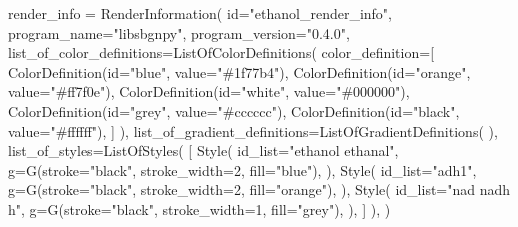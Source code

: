\documentclass[
  letterpaper,
  DIV=11,
  numbers=noendperiod]{scrartcl}
\newenvironment{Shaded}{\begin{snugshade}}{\end{snugshade}}
\newcommand{\BuiltInTok}[1]{\textcolor[rgb]{0.00,0.23,0.31}{#1}}
\newcommand{\DecValTok}[1]{\textcolor[rgb]{0.68,0.00,0.00}{#1}}
\newcommand{\NormalTok}[1]{\textcolor[rgb]{0.00,0.23,0.31}{#1}}
\newcommand{\OperatorTok}[1]{\textcolor[rgb]{0.37,0.37,0.37}{#1}}
\newcommand{\StringTok}[1]{\textcolor[rgb]{0.13,0.47,0.30}{#1}}
\begin{document}
\begin{Shaded}
\begin{Highlighting}[]
\NormalTok{ render\_info }\OperatorTok{=}\NormalTok{ RenderInformation(}
    \BuiltInTok{id}\OperatorTok{=}\StringTok{"ethanol\_render\_info"}\NormalTok{,}
\NormalTok{    program\_name}\OperatorTok{=}\StringTok{"libsbgnpy"}\NormalTok{,}
\NormalTok{    program\_version}\OperatorTok{=}\StringTok{"0.4.0"}\NormalTok{,}
\NormalTok{    list\_of\_color\_definitions}\OperatorTok{=}\NormalTok{ListOfColorDefinitions(}
\NormalTok{        color\_definition}\OperatorTok{=}\NormalTok{[}
\NormalTok{            ColorDefinition(}\BuiltInTok{id}\OperatorTok{=}\StringTok{"blue"}\NormalTok{, value}\OperatorTok{=}\StringTok{"\#1f77b4"}\NormalTok{),}
\NormalTok{            ColorDefinition(}\BuiltInTok{id}\OperatorTok{=}\StringTok{"orange"}\NormalTok{, value}\OperatorTok{=}\StringTok{"\#ff7f0e"}\NormalTok{),}
\NormalTok{            ColorDefinition(}\BuiltInTok{id}\OperatorTok{=}\StringTok{"white"}\NormalTok{, value}\OperatorTok{=}\StringTok{"\#000000"}\NormalTok{),}
\NormalTok{            ColorDefinition(}\BuiltInTok{id}\OperatorTok{=}\StringTok{"grey"}\NormalTok{, value}\OperatorTok{=}\StringTok{"\#cccccc"}\NormalTok{),}
\NormalTok{            ColorDefinition(}\BuiltInTok{id}\OperatorTok{=}\StringTok{"black"}\NormalTok{, value}\OperatorTok{=}\StringTok{"\#ffffff"}\NormalTok{),}
\NormalTok{        ]}
\NormalTok{    ),}
\NormalTok{    list\_of\_gradient\_definitions}\OperatorTok{=}\NormalTok{ListOfGradientDefinitions(}
\NormalTok{    ),}
\NormalTok{    list\_of\_styles}\OperatorTok{=}\NormalTok{ListOfStyles(}
\NormalTok{        [}
\NormalTok{            Style(}
\NormalTok{                id\_list}\OperatorTok{=}\StringTok{"ethanol ethanal"}\NormalTok{,}
\NormalTok{                g}\OperatorTok{=}\NormalTok{G(stroke}\OperatorTok{=}\StringTok{"black"}\NormalTok{, stroke\_width}\OperatorTok{=}\DecValTok{2}\NormalTok{, fill}\OperatorTok{=}\StringTok{"blue"}\NormalTok{),}
\NormalTok{            ),}
\NormalTok{            Style(}
\NormalTok{                id\_list}\OperatorTok{=}\StringTok{"adh1"}\NormalTok{,}
\NormalTok{                g}\OperatorTok{=}\NormalTok{G(stroke}\OperatorTok{=}\StringTok{"black"}\NormalTok{, stroke\_width}\OperatorTok{=}\DecValTok{2}\NormalTok{, fill}\OperatorTok{=}\StringTok{"orange"}\NormalTok{),}
\NormalTok{            ),}
\NormalTok{            Style(}
\NormalTok{                id\_list}\OperatorTok{=}\StringTok{"nad nadh h"}\NormalTok{,}
\NormalTok{                g}\OperatorTok{=}\NormalTok{G(stroke}\OperatorTok{=}\StringTok{"black"}\NormalTok{, stroke\_width}\OperatorTok{=}\DecValTok{1}\NormalTok{, fill}\OperatorTok{=}\StringTok{"grey"}\NormalTok{),}
\NormalTok{            ),}
\NormalTok{        ]}
\NormalTok{    ),}
\NormalTok{)}
\end{Highlighting}
\end{Shaded}
\end{document}
